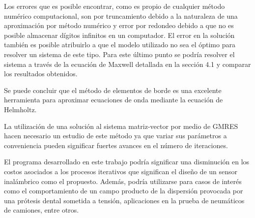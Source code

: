 \documentclass[12pt,letterpaper]{article}
\numberwithin{equation}{section}
\begin{document}
Los errores que es posible encontrar, como es propio de cualquier método numérico computacional, son por truncamiento debido a la naturaleza de una aproximación por método numérico y error por redondeo debido a que no es posible almacenar dígitos infinitos en un computador. El error en la solución también es posible atribuirlo a que el modelo utilizado no sea el óptimo para resolver un sistema de este tipo. Para este último punto se podría resolver el sistema a través de la ecuación de Maxwell detallada en la sección 4.1 y comparar los resultados obtenidos.

Se puede concluir que el método de elementos de borde es una excelente herramienta para aproximar ecuaciones de onda mediante la ecuación de Helmholtz.

La utilización de una solución al sistema matriz-vector por medio de GMRES hacen necesario un estudio de este método ya que variar sus parámetros a conveniencia pueden significar fuertes avances en el número de iteraciones. 

El programa desarrollado en este trabajo podría significar una disminución en los costos asociados a los procesos iterativos que significan el diseño de un sensor inalámbrico como el propuesto. Además, podría utilizarse para casos de interés como el comportamiento de un campo producto de la dispersión provocada por una prótesis dental sometida a tensión, aplicaciones en la prueba de neumáticos de camiones, entre otros.

\pagebreak
{}%
\end{document}

